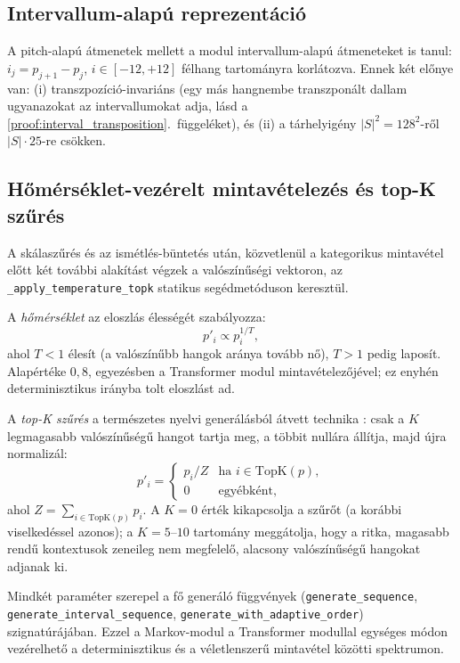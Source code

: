 \subsection{Intervallum-alapú reprezentáció}

A pitch-alapú átmenetek mellett a modul intervallum-alapú átmeneteket is tanul: $i_j = p_{j+1} - p_j$, $i \in [-12, +12]$ félhang tartományra korlátozva. Ennek két előnye van: (i) transzpozíció-invariáns (egy más hangnembe transzponált dallam ugyanazokat az intervallumokat adja, lásd a \ref{proof:interval_transposition}.\ függeléket), és (ii) a tárhelyigény $|S|^2 = 128^2$-ről $|S| \cdot 25$-re csökken.

\subsection{Hőmérséklet-vezérelt mintavételezés és top-K szűrés}

A skálaszűrés és az ismétlés-büntetés után, közvetlenül a kategorikus mintavétel előtt két további alakítást végzek a valószínűségi vektoron, az \texttt{\_apply\_temperature\_topk} statikus segédmetóduson keresztül.

A \emph{hőmérséklet} az eloszlás élességét szabályozza:
\[
p'_i \propto p_i^{1/T},
\]
ahol $T < 1$ élesít (a valószínűbb hangok aránya tovább nő), $T > 1$ pedig laposít. Alapértéke $0{,}8$, egyezésben a Transformer modul mintavételezőjével; ez enyhén determinisztikus irányba tolt eloszlást ad.

A \emph{top-K szűrés} a természetes nyelvi generálásból átvett technika \cite{fan2018hierarchical}: csak a $K$ legmagasabb valószínűségű hangot tartja meg, a többit nullára állítja, majd újra normalizál:
\[
p'_i = \begin{cases} p_i / Z & \text{ha } i \in \mathrm{TopK}(p), \\ 0 & \text{egyébként}, \end{cases}
\]
ahol $Z = \sum_{i \in \mathrm{TopK}(p)} p_i$. A $K = 0$ érték kikapcsolja a szűrőt (a korábbi viselkedéssel azonos); a $K = 5$--$10$ tartomány meggátolja, hogy a ritka, magasabb rendű kontextusok zeneileg nem megfelelő, alacsony valószínűségű hangokat adjanak ki.

Mindkét paraméter szerepel a fő generáló függvények (\texttt{generate\_sequence}, \texttt{generate\_interval\_sequence}, \texttt{generate\_with\_adaptive\_order}) szignatúrájában. Ezzel a Markov-modul a Transformer modullal egységes módon vezérelhető a determinisztikus és a véletlenszerű mintavétel közötti spektrumon.

